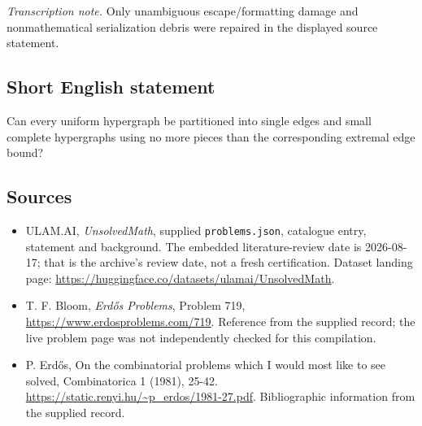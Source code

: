 \documentclass[11pt,a4paper]{article}
\begin{document}
{\small\emph{Transcription note.} Only unambiguous escape/formatting damage and nonmathematical serialization debris were repaired in the displayed source statement.}

\subsection{Short English statement}

Can every uniform hypergraph be partitioned into single edges and small complete hypergraphs using no more pieces than the corresponding extremal edge bound?

\subsection{Sources}

{\small

\begin{itemize}

\item[\hypertarget{source:statement:1}{S1}] ULAM.AI, \emph{UnsolvedMath}, supplied \texttt{problems.json}, catalogue entry, statement and background. The embedded literature-review date is 2026-08-17; that is the archive’s review date, not a fresh certification. Dataset landing page: \url{https://huggingface.co/datasets/ulamai/UnsolvedMath}.

\item[\hypertarget{source:statement:2}{S2}] T. F. Bloom, \emph{Erdős Problems}, Problem 719, \url{https://www.erdosproblems.com/719}. Reference from the supplied record; the live problem page was not independently checked for this compilation.

\item[\hypertarget{source:statement:3}{S3}] P. Erdős, On the combinatorial problems which I would most like to see solved, Combinatorica 1 (1981), 25-42. \url{https://static.renyi.hu/~p_erdos/1981-27.pdf}. Bibliographic information from the supplied record.

\end{itemize}

}

\label{end:statement}
\end{document}
